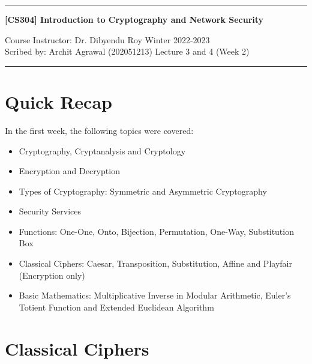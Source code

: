 \documentclass[11pt]{article}
\begin{document}
\noindent
\rule{\textwidth}{1pt}
\begin{center}
{\bf [CS304] Introduction to Cryptography and Network Security}
\end{center}
Course Instructor: Dr. Dibyendu Roy \hfill Winter 2022-2023\\
Scribed by: Archit Agrawal (202051213) \hfill Lecture 3 and 4 (Week 2)
\\
\rule{\textwidth}{1pt}

\section{Quick Recap}
In the first week, the following topics were covered:
\begin{itemize}
    \item Cryptography, Cryptanalysis and Cryptology
    \item Encryption and Decryption
    \item Types of Cryptography: Symmetric and Asymmetric Cryptography
    \item Security Services
    \item Functions: One-One, Onto, Bijection, Permutation, One-Way, Substitution Box
    \item Classical Ciphers: Caesar, Transposition, Substitution, Affine and Playfair (Encryption only)
    \item Basic Mathematics: Multiplicative Inverse in Modular Arithmetic, Euler's Totient Function and Extended Euclidean Algorithm
\end{itemize}

\section{Classical Ciphers}
\end{document}
